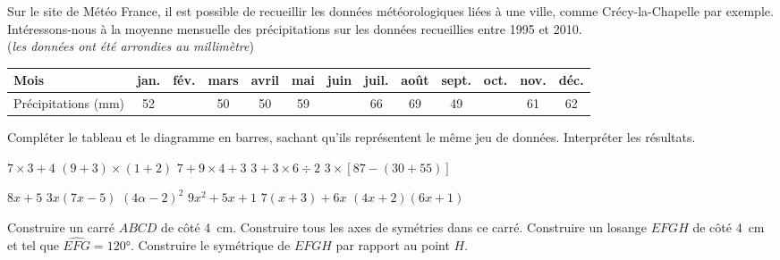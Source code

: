 \documentclass[11pt]{memoir}
\newenvironment{centre}
 {\parskip=0pt\par\nopagebreak\centering}
 {\par\noindent\ignorespacesafterend}
\begin{document}
\begin{questions}
Sur le site de Météo France, il est possible de recueillir les données météorologiques liées à une ville, comme Crécy-la-Chapelle par exemple. Intéressons-nous à la moyenne mensuelle des précipitations sur les données recueillies entre 1995 et 2010. \\(\textit{les données ont été arrondies au millimètre})

\begin{centre}
\begin{tabularx}{0.9\linewidth}{|l||*{12}{C|}}\hline
    Mois & jan. & fév. & mars & avril & mai & juin & juil. & août & sept. & oct. & nov. & déc. \\\hline
    Précipitations (\unit{\milli\meter}) & 52 &  & 50 & 50 & 59 &  & 66 & 69 & 49 &  & 61 & 62 \\\hline
\end{tabularx}
\end{centre}

\begin{centre}
\end{centre}

\question Compléter le tableau et le diagramme en barres, sachant qu'ils représentent le même jeu de données.
\question Interpréter les résultats.

\clearpage

    \question $7 \times  3 + 4$
    \question $(9+3) \times (1+2)$
    \question $7 + 9 \times 4 + 3$
    \question $3 + 3 \times 6 \div 2$
    \question $3 \times \left[ 87 - \left( 30 + 55 \right) \right]$

\vspace{-2em}
    \begin{multicols}{3}
        \question $8x+5$
        \question $3x(7x-5)$
        \question $(4\alpha - 2)^2$
        \question $9x^2+5x+1$
        \question $7(x+3) + 6x$
        \question $(4x+2)(6x+1)$
    \end{multicols}

    \question Construire un carré $ABCD$ de côté \qty{4}{\centi\metre}.
    \question Construire tous les axes de symétries dans ce carré.
    \question Construire un losange $EFGH$ de côté \qty{4}{\centi\metre} et tel que $\widehat{EFG} = \ang{120}$.
    \question Construire le symétrique de $EFGH$ par rapport au point $H$.

\exercicetitre{}

\end{questions}
\end{document}
